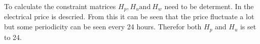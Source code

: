 

To calculate the constraint matrices $H_p, H_u \text{and} \: H_w$ need to be determent. In  the electrical price is descried. From this it can be seen that the price fluctuate a lot but some periodicity can be seen every 24 hours. Therefor both $H_p$ and $ H_u $ is set to 24. 





